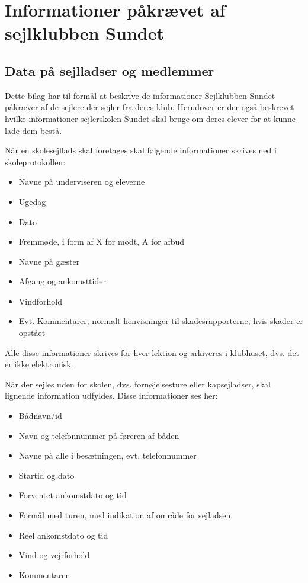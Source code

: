 \chapter{Informationer påkrævet af sejlklubben Sundet}\label{bilag:sundet}

\section{Data på sejlladser og medlemmer}

Dette bilag har til formål at beskrive de informationer Sejlklubben Sundet påkræver af de sejlere der sejler fra deres klub. Herudover er der også beskrevet hvilke informationer sejlerskolen Sundet skal bruge om deres elever for at kunne lade dem bestå.

Når en skolesejllads skal foretages skal følgende informationer skrives ned i skoleprotokollen:

\begin{itemize}
	\item Navne på underviseren og eleverne
	\item Ugedag
	\item Dato
	\item Fremmøde, i form af X for mødt, A for afbud
	\item Navne på gæster
	\item Afgang og ankomsttider
	\item Vindforhold
	\item Evt. Kommentarer, normalt henvisninger til skadesrapporterne, hvis skader er opstået
\end{itemize}

Alle disse informationer skrives for hver lektion og arkiveres i klubhuset, dvs. det er ikke elektronisk.

Når der sejles uden for skolen, dvs. fornøjelsesture eller kapsejladser, skal lignende information udfyldes. 
Disse informationer ses her:

\begin{itemize}
	\item Bådnavn/id
	\item Navn og telefonnummer på føreren af båden
	\item Navne på alle i besætningen, evt. telefonnummer
	\item Startid og dato
	\item Forventet ankomstdato og tid
	\item Formål med turen, med indikation af område for sejladsen
	\item Reel ankomstdato og tid
	\item Vind og vejrforhold
	\item Kommentarer
\end{itemize}

